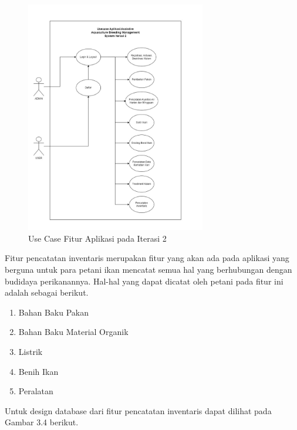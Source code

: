 \begin{figure}[H]
	\centering
	\includegraphics[width=0.7\textwidth]{gambar/akbar/usecase_iterasi_2.jpeg}
	\caption{Use Case Fitur Aplikasi pada Iterasi 2}
\end{figure}

Fitur pencatatan inventaris merupakan fitur yang akan ada pada aplikasi yang berguna untuk para petani ikan mencatat semua hal yang berhubungan dengan budidaya perikanannya. Hal-hal yang dapat dicatat oleh petani pada fitur ini adalah sebagai berikut.

\begin{enumerate}
	\item Bahan Baku Pakan
	\item Bahan Baku Material Organik
	\item Listrik
	\item Benih Ikan
	\item Peralatan
\end{enumerate}

Untuk design database dari fitur pencatatan inventaris dapat dilihat pada Gambar 3.4 berikut.


